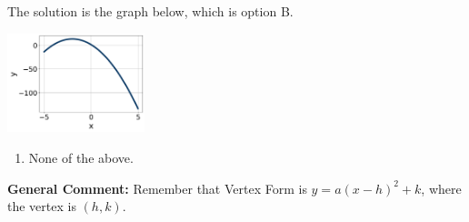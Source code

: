 \documentclass{extbook}[14pt]
\begin{document}
\begin{enumerate}
{The solution is the graph below, which is option B.
\begin{center}
    \includegraphics[width=0.3\textwidth]{../Figures/quadraticEquationToGraphBA.png}
\end{center}\begin{enumerate}[label=\Alph*.]
\item None of the above.\end{enumerate}
\textbf{General Comment:} Remember that Vertex Form is $y = a(x-h)^2+k$, where the vertex is $(h, k)$.
}
\end{enumerate}
\end{document}

